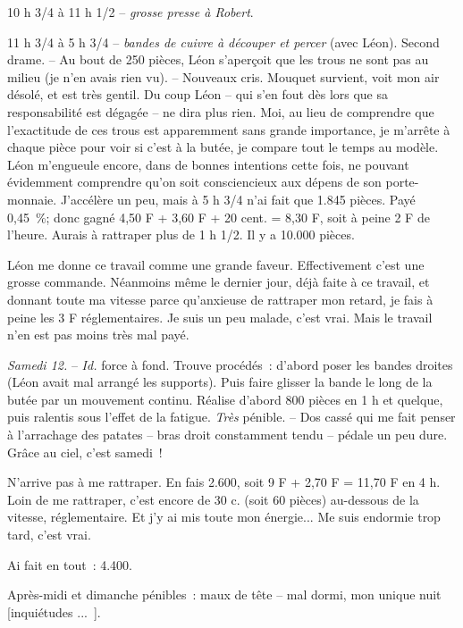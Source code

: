\documentclass[french,twoside]{book} %
\begin{document}
10 h 3/4 à 11 h 1/2 – {\itshape grosse presse à Robert}.\par
11 h 3/4 à 5 h 3/4 – {\itshape bandes de cuivre à découper et percer} (avec Léon). Second drame. – Au bout de 250 pièces, Léon s'aperçoit que les trous ne sont pas au milieu (je n'en avais rien vu). – Nouveaux cris. Mouquet survient, voit mon air désolé, et est très gentil. Du coup Léon – qui s'en fout dès lors que sa responsabilité est dégagée – ne dira plus rien. Moi, au lieu de comprendre que l'exactitude de ces trous est apparemment sans grande importance, je m'arrête à chaque pièce pour voir si c'est à la butée, je compare tout le temps au modèle. Léon m'engueule encore, dans de bonnes intentions cette fois, ne pouvant évidemment comprendre qu'on soit consciencieux aux dépens de son porte-monnaie. J'accélère un peu, mais à 5 h 3/4 n'ai fait que 1.845 pièces. Payé 0,45 \%; donc gagné 4,50 F + 3,60 F + 20 cent. = 8,30 F, soit à peine 2 F de l'heure. Aurais à rattraper plus de 1 h 1/2. Il y a 10.000 pièces.\par
Léon me donne ce travail comme une grande faveur. Effectivement c'est une grosse commande. Néanmoins même le dernier jour, déjà faite à ce travail, et donnant toute ma vitesse parce qu'anxieuse de rattraper mon retard, je fais à peine les 3 F réglementaires. Je suis un peu malade, c'est vrai. Mais le travail n'en est pas moins très mal payé.\par
{\itshape Samedi 12.} – {\itshape Id.} force à fond. Trouve procédés : d'abord poser les bandes droites (Léon avait mal arrangé les supports). Puis faire glisser la bande le long de la butée par un mouvement continu. Réalise d'abord 800 pièces en 1 h et quelque, puis ralentis sous l'effet de la fatigue. {\itshape Très} pénible. – Dos cassé qui me fait penser à l'arrachage des patates – bras droit constamment tendu – pédale un peu dure. Grâce au ciel, c'est samedi !\par
N'arrive pas à me rattraper. En fais 2.600, soit 9 F + 2,70 F = 11,70 F en 4 h. Loin de me rattraper, c'est encore de 30 c. (soit 60 pièces) au-dessous de la vitesse, réglementaire. Et j'y ai mis toute mon énergie... Me suis endormie trop tard, c'est vrai.\par
Ai fait en tout : 4.400.\par
Après-midi et dimanche pénibles : maux de tête – mal dormi, mon unique nuit [inquiétudes ... ].\par
\end{document}
